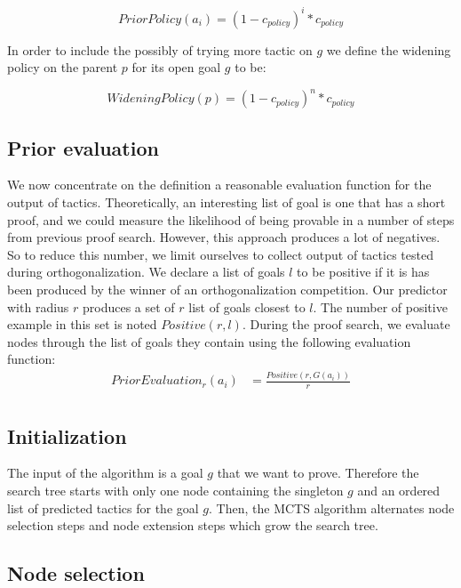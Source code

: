 \documentclass[runningheads,a4paper,draft]{svjour3}
\begin{document}
\[PriorPolicy(a_i) = (1 - c_{policy})^{i} * c_{policy}\]

In order to include the possibly of trying more tactic on $g$ we define the
widening policy on the parent $p$ for its open goal $g$ to be:

\[WideningPolicy(p) = (1 - c_{policy})^{n} * c_{policy}\]


\subsection{Prior evaluation}\label{sec:evaluation}

We now concentrate on the definition a reasonable evaluation function for the
output of tactics. Theoretically, an interesting list of goal is one
that has a short proof, and we could measure the likelihood of being
provable in a number of steps from previous proof search. However, this
approach produces a lot of negatives. So to reduce this number, we limit
ourselves to collect output of tactics tested during orthogonalization. We
declare a list of goals $l$ to be positive if it is has been produced by the
winner of an orthogonalization competition. Our predictor with radius $r$
produces a set of $r$ list of goals
closest to $l$. The
number of positive example in this set is noted $\mathit{Positive}(r,l)$.
During the proof search, we evaluate nodes through the list of goals they
contain using the following evaluation function:
\begin{align*}
\mathit{PriorEvaluation}_r (a_i) &= \frac{\mathit{Positive}(r,G(a_i))}{r}\\
\end{align*}

\subsection{Initialization}
The input of the algorithm is a goal $g$ that we want to prove.
Therefore the search tree starts with only one node containing the singleton
$g$ and an ordered list of predicted tactics for the goal $g$.
Then, the MCTS algorithm alternates node selection steps and node extension
steps which grow the search tree.

\subsection{Node selection}

\end{document}
